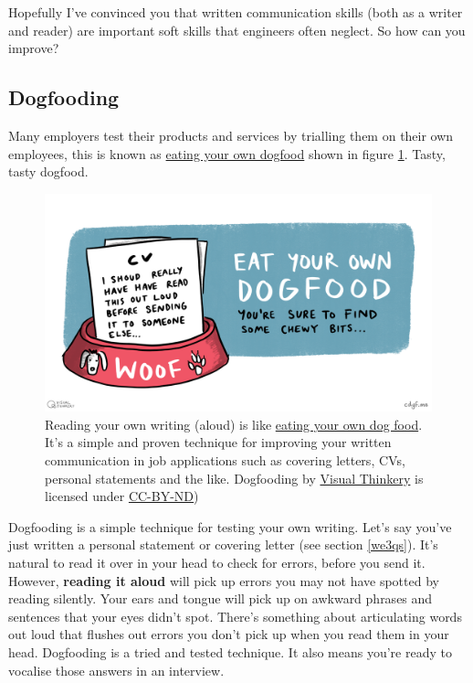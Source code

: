 \documentclass[
]{book}
\begin{document}
Hopefully I've convinced you that written communication skills (both as a writer and reader) are important soft skills that engineers often neglect. So how can you improve?

\hypertarget{dogfooding}{%
\subsection{Dogfooding}\label{dogfooding}}

Many employers test their products and services by trialling them on their own employees, this is known as \href{https://en.wikipedia.org/wiki/Eating_your_own_dog_food}{eating your own dogfood} shown in figure \ref{fig:dogfooding-fig}. Tasty, tasty dogfood. 🐶

\begin{figure}

{\centering \includegraphics[width=1\linewidth]{images/Dogfooding} 

}

\caption{Reading your own writing (aloud) is like \href{https://en.wikipedia.org/wiki/Eating_your_own_dog_food}{eating your own dog food}. It's a simple and proven technique for improving your written communication in job applications such as covering letters, CVs, personal statements and the like. Dogfooding by \href{https://visualthinkery.com/}{Visual Thinkery} is licensed under \href{https://creativecommons.org/licenses/by-nd/4.0/}{CC-BY-ND})}\label{fig:dogfooding-fig}
\end{figure}



Dogfooding is a simple technique for testing your own writing. Let's say you've just written a personal statement or covering letter (see section \ref{we3qs}). It's natural to read it over in your head to check for errors, before you send it. However, \textbf{reading it aloud} will pick up errors you may not have spotted by reading silently. Your ears and tongue will pick up on awkward phrases and sentences that your eyes didn't spot. There's something about articulating words out loud that flushes out errors you don't pick up when you read them in your head. Dogfooding is a tried and tested technique. It also means you're ready to vocalise those answers in an interview.
\end{document}
